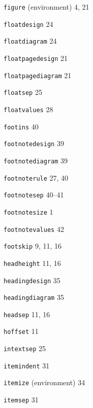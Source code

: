 \documentclass[11pt]{article}
\providecommand{\indexfill}{}
\providecommand{\alphaindexspace}[1]{\indexspace{\bfseries #1}}
\begin{document}
\begin{theindex}
\alphaindexspace{F}


\item \texttt  {figure} (environment)  \indexfill
   4, 21
\item \texttt  {\bs floatdesign}  \indexfill
   24
\item \texttt  {\bs floatdiagram}  \indexfill
   24
\item \texttt  {\bs floatpagedesign}  \indexfill
   21
\item \texttt  {\bs floatpagediagram}  \indexfill
   21
\item \texttt  {\bs floatsep}  \indexfill
   25
\item \texttt  {\bs floatvalues}  \indexfill
   28
\item \texttt  {\bs footins}  \indexfill
   40
\item \texttt  {\bs footnotedesign}  \indexfill
   39
\item \texttt  {\bs footnotediagram}  \indexfill
   39
\item \texttt  {\bs footnoterule}  \indexfill
   27, 40
\item \texttt  {\bs footnotesep}  \indexfill
   40--41
\item \texttt  {\bs footnotesize}  \indexfill
   1
\item \texttt  {\bs footnotevalues}  \indexfill
   42
\item \texttt  {\bs footskip}  \indexfill
   9, 11, 16

\alphaindexspace{H}


\item \texttt  {\bs headheight}  \indexfill
   11, 16
\item \texttt  {\bs headingdesign}  \indexfill
   35
\item \texttt  {\bs headingdiagram}  \indexfill
   35
\item \texttt  {\bs headsep}  \indexfill
   11, 16
\item \texttt  {\bs hoffset}  \indexfill
   11

\alphaindexspace{I}


\item \texttt  {\bs intextsep}  \indexfill
   25
\item \texttt  {\bs itemindent}  \indexfill
   31
\item \texttt  {itemize} (environment)  \indexfill
   34
\item \texttt  {\bs itemsep}  \indexfill
   31

\alphaindexspace{L}



\end{theindex}
\end{document}
